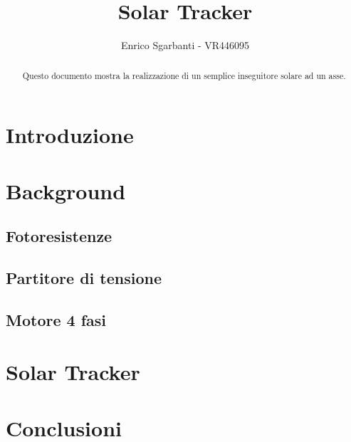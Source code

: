 \documentclass[12pt,twoside,a4paper]{article}
\title{Solar Tracker}
\author{Enrico Sgarbanti - VR446095}
\begin{document}
\maketitle


\begin{abstract}
    Questo documento mostra la realizzazione di un semplice inseguitore solare ad un asse.
\end{abstract}


\section{Introduzione}

\section{Background}

\subsection{Fotoresistenze}

\subsection{Partitore di tensione}

\subsection{Motore 4 fasi}

\section{Solar Tracker}

\section{Conclusioni}



\appendix


\end{document}
